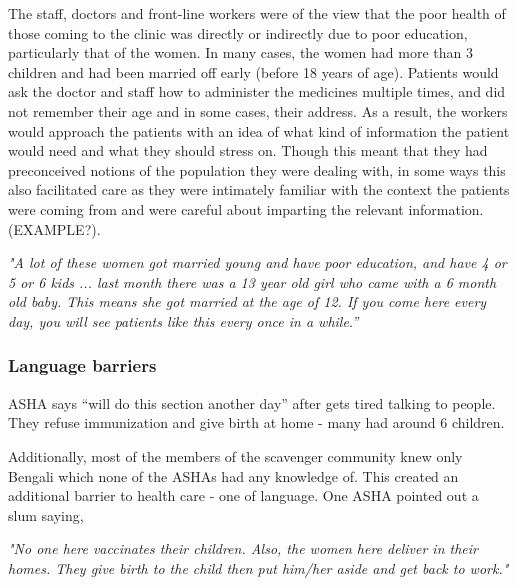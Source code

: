 
The staff, doctors and front-line workers were of the view that the poor health of those coming to the clinic was directly or indirectly due to poor education, particularly that of the women. In many cases, the women had more than 3 children and had been married off early (before 18 years of age). Patients would ask the doctor and staff how to administer the medicines multiple times, and did not remember their age and in some cases, their address. As a result, the workers would approach the patients with an idea of what kind of information the patient would need and what they should stress on. Though this meant that they had preconceived notions of the population they were dealing with, in some ways this also facilitated care as they were intimately familiar with the context the patients were coming from and were careful about imparting the relevant information. (EXAMPLE?).

\textit{"A lot of these women got married young and have poor education, and have 4 or 5 or 6 kids ... last month there was a 13 year old girl who came with a 6 month old baby. This means she got married at the age of 12. If you come here every day, you will see patients like this every once in a while.”}

\subsubsection{Language barriers}
ASHA says “will do this section another day” after gets tired talking to people. 
They refuse immunization and give birth at home - many had around 6 children.

Additionally, most of the members of the scavenger community knew only Bengali which none of the ASHAs had any knowledge of. This created an additional barrier to health care - one of language. One ASHA pointed out a slum saying,

\textit{"No one here vaccinates their children. Also, the women here deliver in their homes. They give birth to the child then put him/her aside and get back to work."} 


